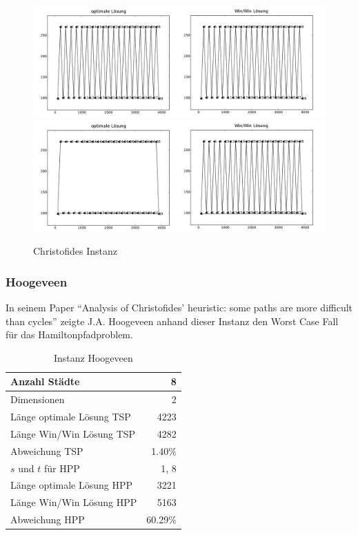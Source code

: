 \documentclass[11pt,a4paper]{article}
\begin{document}
\begin{figure}[H]
        \centering
        \includegraphics[width=15cm]{gfx/christofides_hpp_comparison}
        \includegraphics[width=15cm]{gfx/christofides_tsp_comparison}
        \caption{Christofides Instanz}
        \label{img:christofides_comparison}
\end{figure}

\subsubsection{Hoogeveen}
In seinem Paper "`Analysis of Christofides' heuristic: some paths are more difficult than cycles"'\cite{hoogeveen91} zeigte J.A. Hoogeveen anhand dieser Instanz den Worst Case Fall für das Hamiltonpfadproblem.

\begin{table}[H]
        \centering
        \begin{tabular}{| l | r |}
            \hline
                Anzahl Städte               & 8             \\ \hline
                Dimensionen                 & 2             \\ \hline
                Länge optimale Lösung TSP   & 4223          \\ \hline
                Länge Win/Win Lösung  TSP   & 4282          \\ \hline
                Abweichung TSP              & 1.40\%        \\ \hline
                $s$ und $t$ für HPP         & 1, 8          \\ \hline
                Länge optimale Lösung HPP   & 3221          \\ \hline
                Länge Win/Win Lösung  HPP   & 5163          \\ \hline
                Abweichung HPP              & 60.29\%       \\ \hline
        \end{tabular}
        \caption{Instanz Hoogeveen}
        \label{tab:instanz_hoogeveen}
\end{table}
\end{document}
